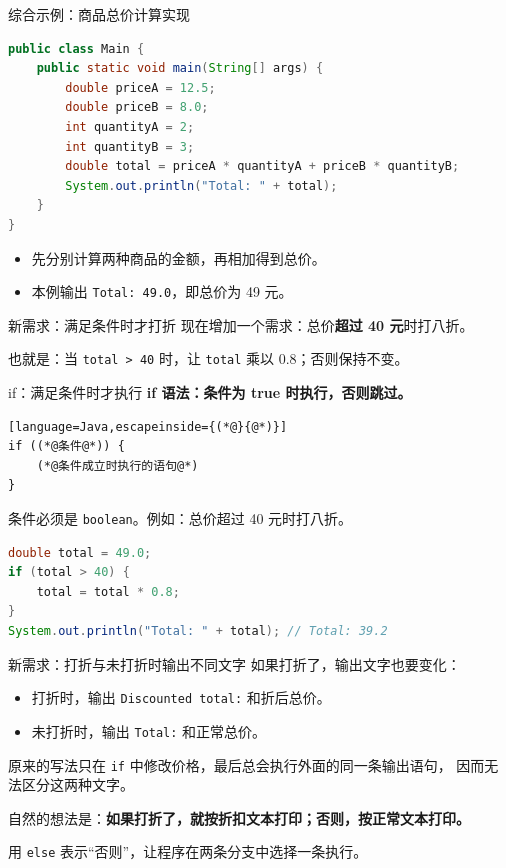 \documentclass[aspectratio=169]{beamer}
\begin{document}
\begin{frame}[fragile]{综合示例：商品总价计算实现}
  \begin{lstlisting}[language=Java]
public class Main {
    public static void main(String[] args) {
        double priceA = 12.5;
        double priceB = 8.0;
        int quantityA = 2;
        int quantityB = 3;
        double total = priceA * quantityA + priceB * quantityB;
        System.out.println("Total: " + total);
    }
}
  \end{lstlisting}
  \begin{itemize}
    \item 先分别计算两种商品的金额，再相加得到总价。
    \item 本例输出 \texttt{Total: 49.0}，即总价为 49 元。
  \end{itemize}
\end{frame}

\begin{frame}{新需求：满足条件时才打折}
  现在增加一个需求：总价\textbf{超过 40 元}时打八折。
  \par
  也就是：当 \texttt{total > 40} 时，让 \texttt{total} 乘以 0.8；否则保持不变。
\end{frame}

\begin{frame}[fragile]{if：满足条件时才执行}
  \textbf{if 语法：条件为 true 时执行，否则跳过。}
  \begin{lstlisting}[language=Java,escapeinside={(*@}{@*)}]
if ((*@条件@*)) {
    (*@条件成立时执行的语句@*)
}
  \end{lstlisting}
  条件必须是 \texttt{boolean}。例如：总价超过 40 元时打八折。
  \begin{lstlisting}[language=Java]
double total = 49.0;
if (total > 40) {
    total = total * 0.8;
}
System.out.println("Total: " + total); // Total: 39.2
  \end{lstlisting}
\end{frame}

\begin{frame}{新需求：打折与未打折时输出不同文字}
  如果打折了，输出文字也要变化：
  \begin{itemize}
    \item 打折时，输出 \texttt{Discounted total:} 和折后总价。
    \item 未打折时，输出 \texttt{Total:} 和正常总价。
  \end{itemize}
  \bigskip
  原来的写法只在 \texttt{if} 中修改价格，最后总会执行外面的同一条输出语句，
  因而无法区分这两种文字。
  \par\bigskip
  自然的想法是：\textbf{如果打折了，就按折扣文本打印；否则，按正常文本打印。}
  \par\medskip
  用 \texttt{else} 表示“否则”，让程序在两条分支中选择一条执行。
\end{frame}
\end{document}
